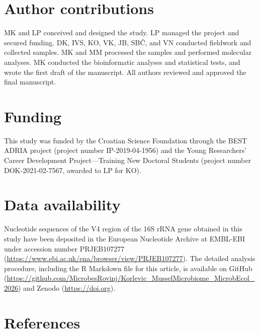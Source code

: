 \documentclass[
  12 pt,
]{article}
\begin{document}
\section{Author contributions}\label{author-contributions}

MK and LP conceived and designed the study. LP managed the project and secured funding. DK, IVS, KO, VK, JB, SBČ, and VN conducted fieldwork and collected samples. MK and MM processed the samples and performed molecular analyses. MK conducted the bioinformatic analyses and statistical tests, and wrote the first draft of the manuscript. All authors reviewed and approved the final manuscript.

\section{Funding}\label{funding}

This study was funded by the Croatian Science Foundation through the BEST ADRIA project (project number IP-2019-04-1956) and the Young Researchers' Career Development Project---Training New Doctoral Students (project number DOK-2021-02-7567, awarded to LP for KO).

\section{Data availability}\label{data-availability}

Nucleotide sequences of the V4 region of the 16S rRNA gene obtained in this study have been deposited in the European Nucleotide Archive at EMBL-EBI under accession number PRJEB107277 (\url{https://www.ebi.ac.uk/ena/browser/view/PRJEB107277}). The detailed analysis procedure, including the R Markdown file for this article, is available on GitHub (\url{https://github.com/MicrobesRovinj/Korlevic_MusselMicrobiome_MicrobEcol_2026}) and Zenodo (\url{https://doi.org}).
\newpage

\section{References}\label{references}
\end{document}
